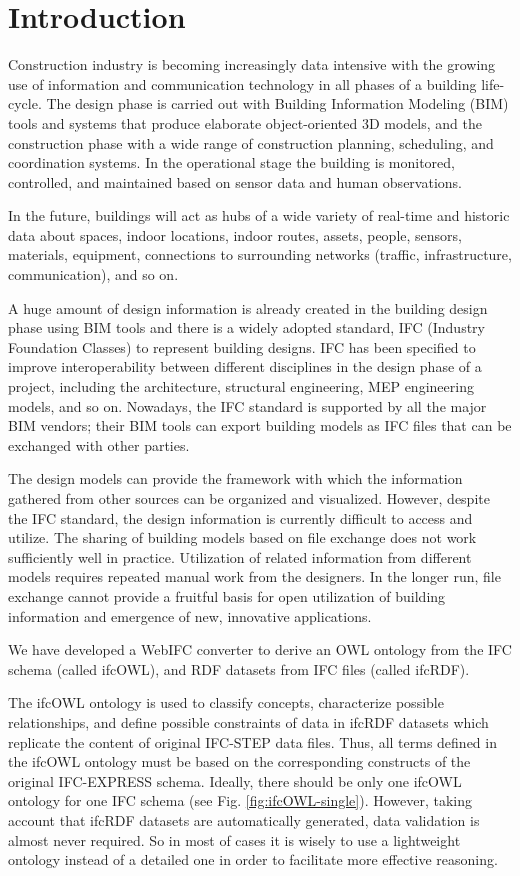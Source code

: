 \section{Introduction}
\label{sec:Introduction}

Construction industry is becoming increasingly data intensive with the growing use of
information and communication technology in all phases of a building life-cycle. The design phase is
carried out with Building Information Modeling (BIM) tools and systems that produce elaborate
object-oriented 3D models, and the construction phase with a wide range of construction planning,
scheduling, and coordination systems. In the operational stage the building is monitored,
controlled, and maintained based on sensor data and human observations.

In the future, buildings will act as hubs of a wide variety of real-time and historic data about
spaces, indoor locations, indoor routes, assets, people, sensors, materials, equipment, connections
to surrounding networks (traffic, infrastructure, communication), and so on.

A huge amount of design information is already created in the building design phase 
using BIM tools and there is a widely adopted standard, IFC (Industry Foundation Classes) to
represent building designs. IFC has been specified to improve interoperability between different
disciplines in the design phase of a project, including the architecture, structural engineering,
MEP engineering models, and so on. Nowadays, the IFC standard is supported by all the major BIM
vendors; their BIM tools can export building models as IFC files that can be exchanged with other
parties.

The design models can provide the framework with which the information gathered from other sources
can be organized and visualized.  However, despite the IFC standard, the design information is currently
difficult to access and utilize. The sharing of building models based on file exchange does not work
sufficiently well in practice. Utilization of related information from different models requires
repeated manual work from the designers. In the longer run, file exchange cannot provide a fruitful
basis for open utilization of building information and emergence of new, innovative applications.

We have developed a WebIFC converter to derive an OWL ontology from the IFC schema (called ifcOWL),
and RDF datasets from IFC files (called ifcRDF).

The ifcOWL ontology is used to classify concepts, characterize possible relationships, and define possible constraints of data in ifcRDF datasets which replicate the content of original IFC-STEP data files. Thus, all terms defined in the ifcOWL ontology must be based on the corresponding constructs of the original IFC-EXPRESS schema. Ideally, there should be only one ifcOWL ontology for one IFC schema (see Fig. \ref{fig:ifcOWL-single}). However, taking account that ifcRDF datasets are automatically generated, data validation is almost never required. So in most of cases it is wisely to use a lightweight ontology instead of a detailed one in order to facilitate more effective reasoning.

